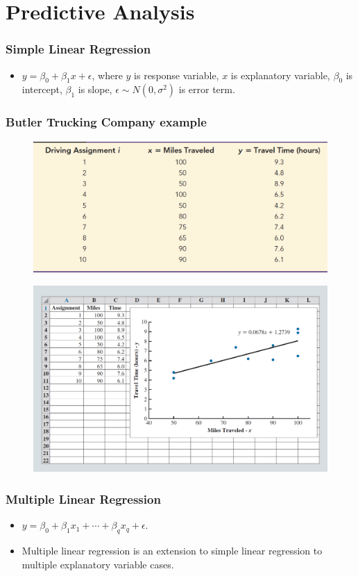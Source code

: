 \documentclass[11pt]{beamer}
\begin{document}
\section{Predictive Analysis}

\begin{frame}
\frametitle{Simple Linear Regression}
\begin{itemize}
    \item $y=\beta_0+\beta_1x+\epsilon$, where $y$ is response variable, $x$ is explanatory variable, $\beta_0$ is intercept, $\beta_1$ is slope, $\epsilon\sim N(0, \sigma^2)$ is error term.  
\end{itemize}
\end{frame}

\begin{frame}
\frametitle{Butler Trucking Company example}
\begin{figure}
    \centering
    \includegraphics[width=0.6\linewidth]{pic/truck_table}
    \label{fig:trucktable}
\end{figure}

\begin{figure}
    \centering
    \includegraphics[width=0.6\linewidth]{pic/truck_regression}
    \label{fig:truckregression}
\end{figure}

\end{frame}

\begin{frame}
\frametitle{Multiple Linear Regression}
\begin{itemize}
    \item $y=\beta_0+\beta_1x_1+\cdots+\beta_qx_q+\epsilon$.  
    \item Multiple linear regression is an extension to simple linear regression to multiple explanatory variable cases.
\end{itemize}
\end{frame}
\end{document}
